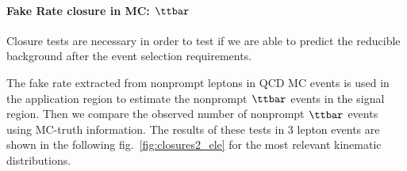 \paragraph{Fake Rate closure in MC: $\ttbar$}
Closure tests are necessary in order to test if we are able to predict the reducible background after the event selection requirements.

The fake rate extracted from nonprompt leptons in QCD MC events is used in the application region to estimate the nonprompt $\ttbar$ events in the signal region. Then we compare the observed number of nonprompt $\ttbar$ events using MC-truth information. The results of these tests in 3 lepton events are shown in the following fig.~\ref{fig:closures2_ele} for the most relevant kinematic distributions.

\begin{figure}[h]
\noindent
{}
\end{figure}
